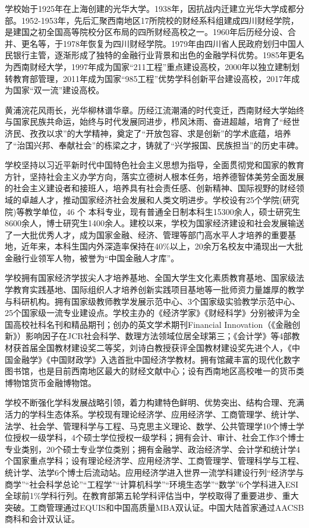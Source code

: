 学校始于1925年在上海创建的光华大学。1938年，因抗战内迁建立光华大学成都分部。1952-1953年，先后汇聚西南地区17所院校的财经系科组建成四川财经学院，是建国之初全国高等院校分区布局的四所财经高校之一。1960年后历经分设、合并、更名等，于1978年恢复为四川财经学院。1979年由四川省人民政府划归中国人民银行主管，逐渐形成了独特的金融行业背景和出色的金融学科优势。1985年更名为西南财经大学，1997年成为国家“211工程”重点建设高校，2000年以独立建制划转教育部管理，2011年成为国家“985工程”优势学科创新平台建设高校，2017年成为国家“双一流”建设高校。

黄浦浣花风雨长，光华柳林谱华章。历经江流潮涌的时代变迁，西南财经大学始终与国家民族共命运，始终与时代发展同进步，栉风沐雨、奋进超越，培育了“经世济民、孜孜以求”的大学精神，奠定了“开放包容、求是创新”的学术底蕴，培养了“治国兴邦、奉献社会”的栋梁之才，铸就了“兴学报国、民族担当”的历史丰碑。

学校坚持以习近平新时代中国特色社会主义思想为指导，全面贯彻党和国家的教育方针，坚持社会主义办学方向，落实立德树人根本任务，培养德智体美劳全面发展的社会主义建设者和接班人，培养具有社会责任感、创新精神、国际视野的财经领域的卓越人才，推动国家经济社会发展和人类文明进步。学校设有25个学院(研究院)等教学单位，46 个 本科专业，现有普通全日制本科生15300余人，硕士研究生8600余人，博士研究生1400余人。建校以来，学校为国家经济建设和社会发展输送了一大批优秀人才，成为国家金融、经济、管理等部门高水平人才培养的重要基地，近年来，本科生国内外深造率保持在40\%以上，20余万名校友中涌现出一大批金融行业领军人物，被誉为“中国金融人才库”。

学校拥有国家经济学拔尖人才培养基地、全国大学生文化素质教育基地、国家级法学教育实践基地、国际组织人才培养创新实践项目基地等一批师资力量雄厚的教学与科研机构。拥有国家级教师教学发展示范中心、3个国家级实验教学示范中心、25个国家级一流专业建设点。学校主办的《经济学家》《财经科学》分别被评为全国高校社科名刊和精品期刊；创办的英文学术期刊Financial Innovation（《金融创新》）影响因子在JCR社会科学、数理方法领域位居全球第三；《会计学》等4部教材获首届全国教材建设奖二等奖，刘诗白教授获评全国教材建设奖先进个人，《中国金融学》《中国财政学》入选首批中国经济学教材。拥有馆藏丰富的现代化数字图书馆，也是目前西南地区最大的财经文献中心；设有西南地区高校唯一的货币类博物馆货币金融博物馆。

学校不断强化学科发展战略引领，着力构建特色鲜明、优势突出、结构合理、充满活力的学科生态体系。学校现有理论经济学、应用经济学、工商管理学、统计学、法学、社会学、管理科学与工程、马克思主义理论、数学、公共管理学10个博士学位授权一级学科，4个硕士学位授权一级学科；拥有会计、审计、社会工作3个博士专业类别，20个硕士专业学位类别；拥有金融学、政治经济学、会计学和统计学4个国家重点学科；设有理论经济学、应用经济学、工商管理学、管理科学与工程、统计学、法学6个博士后流动站。应用经济学进入世界一流学科建设行列“经济学与商学”“社会科学总论”“工程学”“计算机科学”“环境生态学”“数学”6个学科进入ESI全球前1\%学科行列。在教育部第五轮学科评估当中，学校取得了重要进步、重大突破。工商管理通过EQUIS和中国高质量MBA双认证。中国大陆首家通过AACSB商科和会计双认证。

